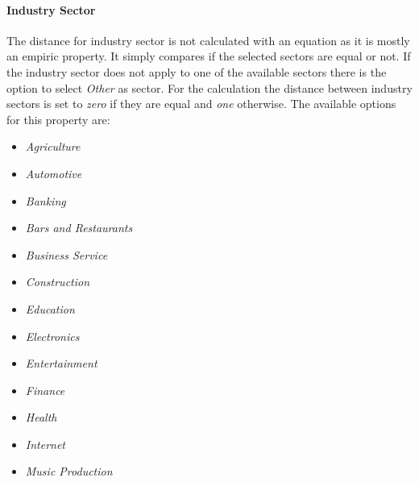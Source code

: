 \paragraph*{\textbf{Industry Sector}}
The distance for industry sector is not calculated with an equation as it is mostly an empiric property. It simply compares if the selected sectors are equal or not. If the industry sector does not apply to one of the available sectors there is the option to select \textit{Other} as sector. For the calculation the distance between industry sectors is set to \textit{zero} if they are equal and  \textit{one} otherwise. The available options for this property are:
\begin{itemize}
	\item \textit{Agriculture}
	\item \textit{Automotive}
	\item \textit{Banking}
	\item \textit{Bars and Restaurants}
	\item \textit{Business Service}
	\item \textit{Construction}
	\item \textit{Education}
	\item \textit{Electronics}
	\item \textit{Entertainment}
	\item \textit{Finance}
	\item \textit{Health}
	\item \textit{Internet}
	\item \textit{Music Production}
\end{itemize}

